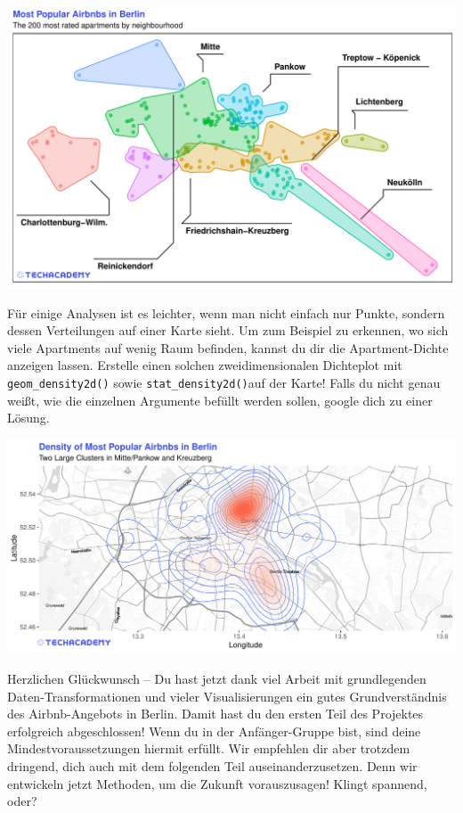 \documentclass[
]{book}
\begin{document}
\includegraphics[width=1\linewidth]{plots/4_2_map_top200_by_neighbourhood}

Für einige Analysen ist es leichter, wenn man nicht einfach nur Punkte, sondern dessen Verteilungen auf einer Karte sieht.
Um zum Beispiel zu erkennen, wo sich viele Apartments auf wenig Raum befinden, kannst du dir die Apartment-Dichte anzeigen lassen.
Erstelle einen solchen zweidimensionalen Dichteplot mit \texttt{geom\_density2d()} sowie \texttt{stat\_density2d()}auf der Karte!
Falls du nicht genau weißt, wie die einzelnen Argumente befüllt werden sollen, google dich zu einer Lösung.

\includegraphics[width=1\linewidth]{plots/4_3_map_top200_density}

Herzlichen Glückwunsch -- Du hast jetzt dank viel Arbeit mit grundlegenden Daten-Transformationen und vieler Visualisierungen ein gutes Grundverständnis des Airbnb-Angebots in Berlin.
Damit hast du den ersten Teil des Projektes erfolgreich abgeschlossen!
Wenn du in der Anfänger-Gruppe bist, sind deine Mindestvoraussetzungen hiermit erfüllt.
Wir empfehlen dir aber trotzdem dringend, dich auch mit dem folgenden Teil auseinanderzusetzen. Denn wir entwickeln jetzt Methoden, um die Zukunft vorauszusagen!
Klingt spannend, oder?
\end{document}
